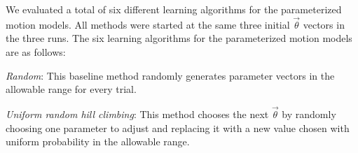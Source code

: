 We evaluated a total of six different learning algorithms for the
parameterized motion models.  All methods were started at the same
three initial $\vec{\theta}$ vectors in the three runs.
The six learning algorithms for the parameterized motion models are as follows:









\emph{Random}: This baseline method randomly generates parameter vectors in the
allowable range for every trial.

\emph{Uniform random hill climbing}: This method chooses the next $\vec{\theta}$ by
  randomly choosing one parameter to adjust and replacing it with a
  new value chosen with uniform probability in the allowable range.

